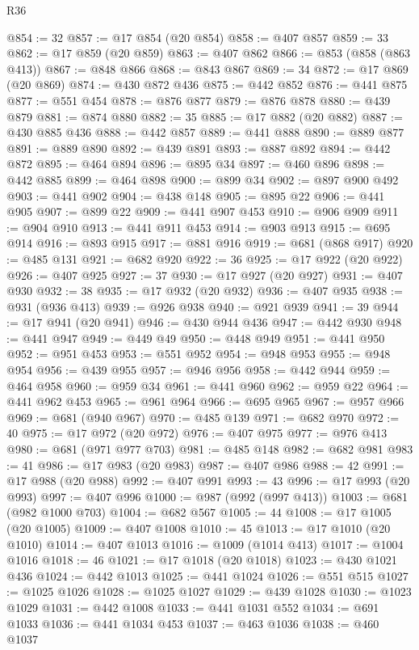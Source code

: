 \begin{lexlean}{R36}
\begin{coremodule}
{{{{{{{{{{{{{{{{{{{{{{{{{{{{{{{{{{{{{{{{{{{{{{{{{{{{{{{{{{{{{{{{{{{{{{{{{{{{{{{{{{@854 := 32
@857 := @17 @854 (@20 @854)
@858 := @407 @857
@859 := 33
@862 := @17 @859 (@20 @859)
@863 := @407 @862
@866 := @853 (@858 (@863 @413))
@867 := @848 @866
@868 := @843 @867
@869 := 34
@872 := @17 @869 (@20 @869)
@874 := @430 @872 @436
@875 := @442 @852
@876 := @441 @875
@877 := @551 @454
@878 := @876 @877
@879 := @876 @878
@880 := @439 @879
@881 := @874 @880
@882 := 35
@885 := @17 @882 (@20 @882)
@887 := @430 @885 @436
@888 := @442 @857
@889 := @441 @888
@890 := @889 @877
@891 := @889 @890
@892 := @439 @891
@893 := @887 @892
@894 := @442 @872
@895 := @464 @894
@896 := @895 @34
@897 := @460 @896
@898 := @442 @885
@899 := @464 @898
@900 := @899 @34
@902 := @897 @900 @492
@903 := @441 @902
@904 := @438 @148
@905 := @895 @22
@906 := @441 @905
@907 := @899 @22
@909 := @441 @907 @453
@910 := @906 @909
@911 := @904 @910
@913 := @441 @911 @453
@914 := @903 @913
@915 := @695 @914
@916 := @893 @915
@917 := @881 @916
@919 := @681 (@868 @917)
@920 := @485 @131
@921 := @682 @920
@922 := 36
@925 := @17 @922 (@20 @922)
@926 := @407 @925
@927 := 37
@930 := @17 @927 (@20 @927)
@931 := @407 @930
@932 := 38
@935 := @17 @932 (@20 @932)
@936 := @407 @935
@938 := @931 (@936 @413)
@939 := @926 @938
@940 := @921 @939
@941 := 39
@944 := @17 @941 (@20 @941)
@946 := @430 @944 @436
@947 := @442 @930
@948 := @441 @947
@949 := @449 @49
@950 := @448 @949
@951 := @441 @950
@952 := @951 @453
@953 := @551 @952
@954 := @948 @953
@955 := @948 @954
@956 := @439 @955
@957 := @946 @956
@958 := @442 @944
@959 := @464 @958
@960 := @959 @34
@961 := @441 @960
@962 := @959 @22
@964 := @441 @962 @453
@965 := @961 @964
@966 := @695 @965
@967 := @957 @966
@969 := @681 (@940 @967)
@970 := @485 @139
@971 := @682 @970
@972 := 40
@975 := @17 @972 (@20 @972)
@976 := @407 @975
@977 := @976 @413
@980 := @681 (@971 @977 @703)
@981 := @485 @148
@982 := @682 @981
@983 := 41
@986 := @17 @983 (@20 @983)
@987 := @407 @986
@988 := 42
@991 := @17 @988 (@20 @988)
@992 := @407 @991
@993 := 43
@996 := @17 @993 (@20 @993)
@997 := @407 @996
@1000 := @987 (@992 (@997 @413))
@1003 := @681 (@982 @1000 @703)
@1004 := @682 @567
@1005 := 44
@1008 := @17 @1005 (@20 @1005)
@1009 := @407 @1008
@1010 := 45
@1013 := @17 @1010 (@20 @1010)
@1014 := @407 @1013
@1016 := @1009 (@1014 @413)
@1017 := @1004 @1016
@1018 := 46
@1021 := @17 @1018 (@20 @1018)
@1023 := @430 @1021 @436
@1024 := @442 @1013
@1025 := @441 @1024
@1026 := @551 @515
@1027 := @1025 @1026
@1028 := @1025 @1027
@1029 := @439 @1028
@1030 := @1023 @1029
@1031 := @442 @1008
@1033 := @441 @1031 @552
@1034 := @691 @1033
@1036 := @441 @1034 @453
@1037 := @463 @1036
@1038 := @460 @1037
}}}}}}}}}}}}}}}}}}}}}}}}}}}}}}}}}}}}}}}}}}}}}}}}}}}}}}}}}}}}}}}}}}}}}}}}}}}}}}}}}}
\end{coremodule}
\end{lexlean}
